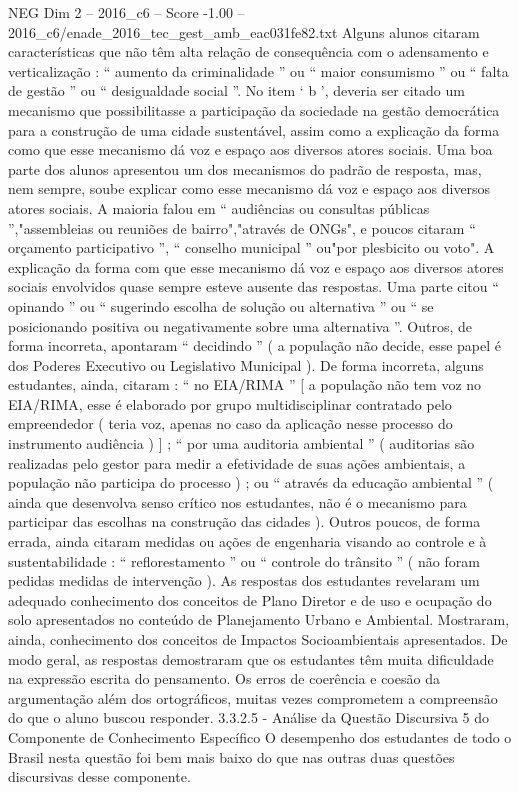 \begin{textsample}{NEG Dim 2 – 2016\_c6 – Score -1.00 – 2016\_c6/enade\_2016\_tec\_gest\_amb\_eac031fe82.txt}
Alguns alunos citaram características que não têm alta relação de consequência com o adensamento e verticalização : “ aumento da criminalidade ” ou “ maior consumismo ” ou “ falta de gestão ” ou “ desigualdade social ”.
No item ‘ b ’, deveria ser citado um mecanismo que possibilitasse a participação da sociedade na gestão democrática para a construção de uma cidade sustentável, assim como a explicação da forma como que esse mecanismo dá voz e espaço aos diversos atores sociais.
Uma boa parte dos alunos apresentou um dos mecanismos do padrão de resposta, mas, nem sempre, soube explicar como esse mecanismo dá voz e espaço aos diversos atores sociais.
A maioria falou em “ audiências ou consultas públicas ”,"assembleias ou reuniões de bairro","através de ONGs", e poucos citaram “ orçamento participativo ”, “ conselho municipal ” ou"por plesbicito ou voto".
A explicação da forma com que esse mecanismo dá voz e espaço aos diversos atores sociais envolvidos quase sempre esteve ausente das respostas.
Uma parte citou “ opinando ” ou “ sugerindo escolha de solução ou alternativa ” ou “ se posicionando positiva ou negativamente sobre uma alternativa ”.
Outros, de forma incorreta, apontaram “ decidindo ” ( a população não decide, esse papel é dos Poderes Executivo ou Legislativo Municipal ).
De forma incorreta, alguns estudantes, ainda, citaram : “ no EIA/RIMA ” [ a população não tem voz no EIA/RIMA, esse é elaborado por grupo multidisciplinar contratado pelo empreendedor ( teria voz, apenas no caso da aplicação nesse processo do instrumento audiência ) ] ; “ por uma auditoria ambiental ” ( auditorias são realizadas pelo gestor para medir a efetividade de suas ações ambientais, a população não participa do processo ) ; ou “ através da educação ambiental ” ( ainda que desenvolva senso crítico nos estudantes, não é o mecanismo para participar das escolhas na construção das cidades ).
Outros poucos, de forma errada, ainda citaram medidas ou ações de engenharia visando ao controle e à sustentabilidade : “ reflorestamento ” ou “ controle do trânsito ” ( não foram pedidas medidas de intervenção ).
As respostas dos estudantes revelaram um adequado conhecimento dos conceitos de Plano Diretor e de uso e ocupação do solo apresentados no conteúdo de Planejamento Urbano e Ambiental.
Mostraram, ainda, conhecimento dos conceitos de Impactos Socioambientais apresentados.
De modo geral, as respostas demostraram que os estudantes têm muita dificuldade na expressão escrita do pensamento.
Os erros de coerência e coesão da argumentação além dos ortográficos, muitas vezes comprometem a compreensão do que o aluno buscou responder. 3.3.2.5 - Análise da Questão Discursiva 5 do Componente de Conhecimento Específico O desempenho dos estudantes de todo o Brasil nesta questão foi bem mais baixo do que nas outras duas questões discursivas desse componente.

\end{textsample}
